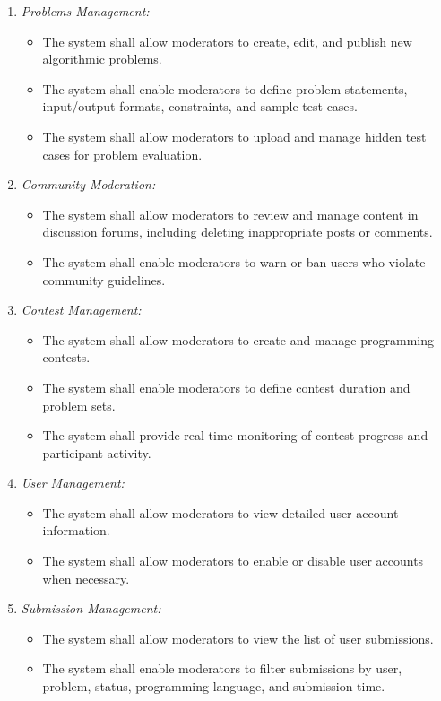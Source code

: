 \begin{enumerate}
    \item \textit{Problems Management:}
        \begin{itemize}
            \item The system shall allow moderators to create, edit, and publish new algorithmic problems.
            \item The system shall enable moderators to define problem statements, input/output formats, constraints, and sample test cases.
            \item The system shall allow moderators to upload and manage hidden test cases for problem evaluation.
        \end{itemize}
    \item \textit{Community Moderation:}
        \begin{itemize}
            \item The system shall allow moderators to review and manage content in discussion forums, including deleting inappropriate posts or comments.
            \item The system shall enable moderators to warn or ban users who violate community guidelines.
        \end{itemize}
    \item \textit{Contest Management:}
        \begin{itemize}
            \item The system shall allow moderators to create and manage programming contests.
            \item The system shall enable moderators to define contest duration and problem sets.
            \item The system shall provide real-time monitoring of contest progress and participant activity.
        \end{itemize}
    \item \textit{User Management:}
        \begin{itemize}
            \item The system shall allow moderators to view detailed user account information.
            \item The system shall allow moderators to enable or disable user accounts when necessary.
        \end{itemize}

    \item \textit{Submission Management:}
        \begin{itemize}
            \item The system shall allow moderators to view the list of user submissions.
            \item The system shall enable moderators to filter submissions by user, problem, status, programming language, and submission time.
        \end{itemize}


\end{enumerate}
